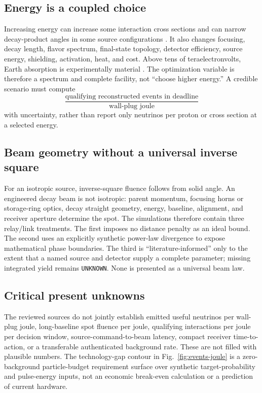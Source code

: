 \documentclass[11pt]{article}
\newcommand{\unknown}{\texttt{UNKNOWN}}
\begin{document}
\subsection{Energy is a coupled choice}

Increasing energy can increase some interaction cross sections and can narrow decay-product angles in some source configurations \citep{Geer1998,Huber2010,Zeller2024}. It also changes focusing, decay length, flavor spectrum, final-state topology, detector efficiency, source energy, shielding, activation, heat, and cost. Above tens of teraelectronvolts, Earth absorption is experimentally material \citep{IceCube2017}. The optimization variable is therefore a spectrum and complete facility, not ``choose higher energy.'' A credible scenario must compute
\begin{equation}
\frac{\text{qualifying reconstructed events in deadline}}{\text{wall-plug joule}}
\end{equation}
with uncertainty, rather than report only neutrinos per proton or cross section at a selected energy.

\subsection{Beam geometry without a universal inverse square}

For an isotropic source, inverse-square fluence follows from solid angle. An engineered decay beam is not isotropic: parent momentum, focusing horns or storage-ring optics, decay straight geometry, energy, baseline, alignment, and receiver aperture determine the spot. The simulations therefore contain three relay/link treatments. The first imposes no distance penalty as an ideal bound. The second uses an explicitly synthetic power-law divergence to expose mathematical phase boundaries. The third is ``literature-informed'' only to the extent that a named source and detector supply a complete parameter; missing integrated yield remains \unknown. None is presented as a universal beam law.

\subsection{Critical present unknowns}

The reviewed sources do not jointly establish emitted useful neutrinos per wall-plug joule, long-baseline spot fluence per joule, qualifying interactions per joule per decision window, source-command-to-beam latency, compact receiver time-to-action, or a transferable authenticated background rate. These are not filled with plausible numbers. The technology-gap contour in Fig.~\ref{fig:events-joule} is a zero-background particle-budget requirement surface over synthetic target-probability and pulse-energy inputs, not an economic break-even calculation or a prediction of current hardware.
\end{document}
